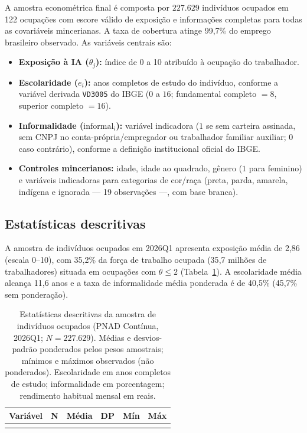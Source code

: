 A amostra econométrica final é composta por $227.629$ indivíduos ocupados em 122 ocupações com escore válido de exposição e informações completas para todas as covariáveis mincerianas. A taxa de cobertura atinge 99{,}7\% do emprego brasileiro observado. As variáveis centrais são:
\begin{itemize}
    \item \textbf{Exposição à IA ($\theta_j$):} índice de 0 a 10 atribuído à ocupação do trabalhador.
    \item \textbf{Escolaridade ($e_i$):} anos completos de estudo do indivíduo, conforme a variável derivada \texttt{VD3005} do IBGE ($0$ a $16$; fundamental completo $= 8$, superior completo $= 16$).
    \item \textbf{Informalidade ($\text{informal}_i$):} variável indicadora ($1$ se sem carteira assinada, sem CNPJ no conta-própria/empregador ou trabalhador familiar auxiliar; $0$ caso contrário), conforme a definição institucional oficial do IBGE.
    \item \textbf{Controles mincerianos:} idade, idade ao quadrado, gênero ($1$ para feminino) e variáveis indicadoras para categorias de cor/raça (preta, parda, amarela, indígena e ignorada --- 19 observações ---, com base branca).
\end{itemize}

\subsection{Estatísticas descritivas}

A amostra de indivíduos ocupados em 2026Q1 apresenta exposição média de 2{,}86 (escala 0--10), com 35{,}2\% da força de trabalho ocupada (35{,}7 milhões de trabalhadores) situada em ocupações com $\theta \le 2$ (Tabela~\ref{tab:descritivas}). A escolaridade média alcança 11{,}6 anos e a taxa de informalidade média ponderada é de 40{,}5\% (45{,}7\% sem ponderação).

\begin{table}[htbp]
\centering
\caption{Estatísticas descritivas da amostra de indivíduos ocupados (PNAD Contínua, 2026Q1; $N = 227.629$). Médias e desvios-padrão ponderados pelos pesos amostrais; mínimos e máximos observados (não ponderados). Escolaridade em anos completos de estudo; informalidade em porcentagem; rendimento habitual mensal em reais.}
\label{tab:descritivas}
\begin{tabular}{lccccc}
\toprule
Variável & N & Média & DP & Mín & Máx \\
\midrule
 \\
\bottomrule
\end{tabular}
\end{table}

